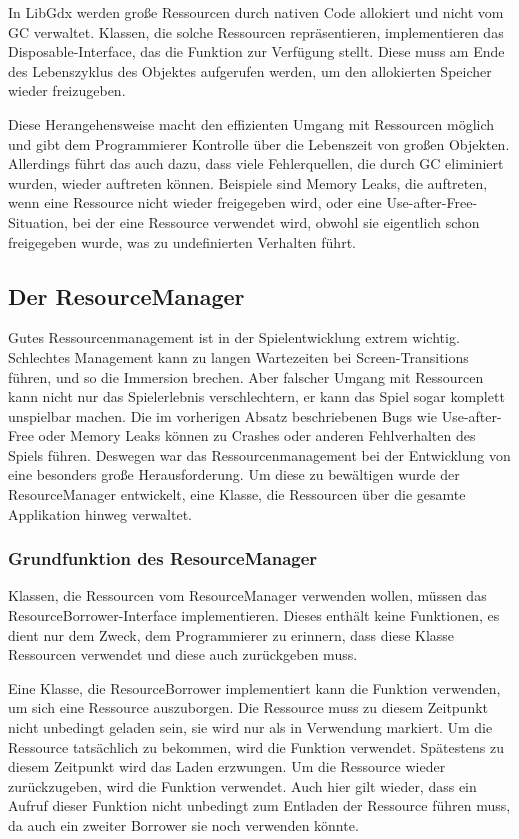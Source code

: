 In LibGdx werden große Ressourcen durch nativen Code allokiert und nicht vom GC verwaltet.
Klassen, die solche Ressourcen repräsentieren, implementieren das Disposable-Interface, das die
 Funktion zur Verfügung stellt.
Diese muss am Ende des Lebenszyklus des Objektes aufgerufen werden, um den allokierten Speicher wieder freizugeben.\cite{libGdxMemoryManagement}

Diese Herangehensweise macht den effizienten Umgang mit Ressourcen möglich und gibt dem Programmierer Kontrolle über
die Lebenszeit von großen Objekten.
Allerdings führt das auch dazu, dass viele Fehlerquellen, die durch GC eliminiert wurden, wieder auftreten können.
Beispiele sind Memory Leaks, die auftreten, wenn eine Ressource nicht wieder freigegeben wird, oder eine
Use-after-Free-Situation, bei der eine Ressource verwendet wird, obwohl sie eigentlich schon freigegeben wurde, was
zu undefinierten Verhalten führt.\cite{libGdxMemoryManagement}

\subsection{Der ResourceManager}

Gutes Ressourcenmanagement ist in der Spielentwicklung extrem wichtig.
Schlechtes Management kann \zB zu langen Wartezeiten bei Screen-Transitions führen, und so die Immersion brechen.
Aber falscher Umgang mit Ressourcen kann nicht nur das Spielerlebnis verschlechtern, er kann das Spiel sogar
komplett unspielbar machen.
Die im vorherigen Absatz beschriebenen Bugs wie Use-after-Free oder Memory Leaks können zu Crashes oder anderen
Fehlverhalten des Spiels führen.
Deswegen war das Ressourcenmanagement bei der Entwicklung von \FF eine besonders große Herausforderung.
Um diese zu bewältigen wurde der ResourceManager entwickelt, eine Klasse, die Ressourcen über die gesamte
Applikation hinweg verwaltet.

\subsubsection{Grundfunktion des ResourceManager}

Klassen, die Ressourcen vom ResourceManager verwenden wollen, müssen das ResourceBorrower-Interface implementieren.
Dieses enthält keine Funktionen, es dient nur dem Zweck, dem Programmierer zu erinnern, dass diese Klasse Ressourcen
verwendet und diese auch zurückgeben muss.

Eine Klasse, die ResourceBorrower implementiert kann die  Funktion verwenden,
um sich eine Ressource auszuborgen.
Die Ressource muss zu diesem Zeitpunkt nicht unbedingt geladen sein, sie wird nur als in Verwendung markiert.
Um die Ressource tatsächlich zu bekommen, wird die  Funktion verwendet.
Spätestens zu diesem Zeitpunkt wird das Laden erzwungen.
Um die Ressource wieder zurückzugeben, wird die  Funktion verwendet.
Auch hier gilt wieder, dass ein Aufruf dieser Funktion nicht unbedingt zum Entladen der Ressource führen muss,
da auch ein zweiter Borrower sie noch verwenden könnte.

